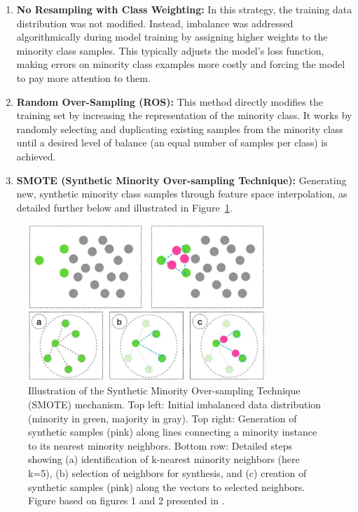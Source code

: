 \documentclass[12pt,a4paper]{report}
\begin{document}
\begin{enumerate}
    \item \textbf{No Resampling with Class Weighting:} In this strategy, the training data distribution was not modified. Instead, imbalance was addressed algorithmically during model training by assigning higher weights to the minority class samples. This typically adjusts the model's loss function, making errors on minority class examples more costly and forcing the model to pay more attention to them.
    \item \textbf{Random Over-Sampling (ROS):} This method directly modifies the training set by increasing the representation of the minority class. It works by randomly selecting and duplicating existing samples from the minority class until a desired level of balance (an equal number of samples per class) is achieved.
    \item \textbf{SMOTE (Synthetic Minority Over-sampling Technique):} Generating new, synthetic minority class samples through feature space interpolation, as detailed further below and illustrated in Figure~\ref{fig:SMOTE_explained}.
\end{enumerate}

\begin{figure}[htbp]
    \centering
    \includegraphics[width=0.8\textwidth]{images/SMOTE-explained.png}
    \caption[Illustration of the SMOTE mechanism]{Illustration of the Synthetic Minority Over-sampling Technique (SMOTE) mechanism. Top left: Initial imbalanced data distribution (minority in green, majority in gray). Top right: Generation of synthetic samples (pink) along lines connecting a minority instance to its nearest minority neighbors. Bottom row: Detailed steps showing (a) identification of k-nearest minority neighbors (here k=5), (b) selection of neighbors for synthesis, and (c) creation of synthetic samples (pink) along the vectors to selected neighbors. Figure based on figures 1 and 2 presented in \cite{Truong2022SMOTEVariants}.}
    \label{fig:SMOTE_explained} %
\end{figure}
\end{document}
